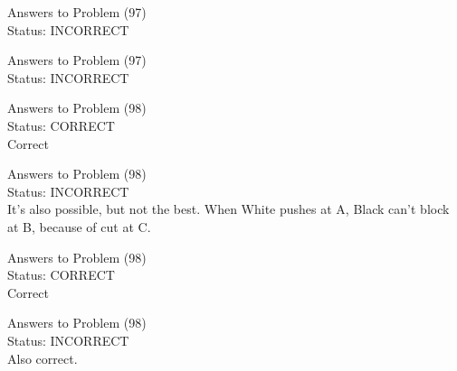 \documentclass[11pt]{article}
\begin{document}
\begin{minipage}[t]{0.5\textwidth}
  {\centering
  
  Answers to Problem (97)\\
  Status: INCORRECT\\
  
  }
\end{minipage}
\begin{minipage}[t]{0.5\textwidth}
  {\centering
  
  Answers to Problem (97)\\
  Status: INCORRECT\\
  
  }
\end{minipage}
\begin{minipage}[t]{0.5\textwidth}
  {\centering
  
  Answers to Problem (98)\\
  Status: CORRECT\\
  Correct\\
  }
\end{minipage}
\begin{minipage}[t]{0.5\textwidth}
  {\centering
  
  Answers to Problem (98)\\
  Status: INCORRECT\\
  It's also possible, but not the best. When White pushes at A, Black can't block at B, because of cut at C.\\
  }
\end{minipage}
\begin{minipage}[t]{0.5\textwidth}
  {\centering
  
  Answers to Problem (98)\\
  Status: CORRECT\\
  Correct\\
  }
\end{minipage}
\begin{minipage}[t]{0.5\textwidth}
  {\centering
  
  Answers to Problem (98)\\
  Status: INCORRECT\\
  Also correct.\\
  }
\end{minipage}
\end{document}

